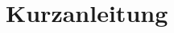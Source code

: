\documentclass[a4paper,11pt]{scrartcl}
\begin{document}
\section{Kurzanleitung}\label{Kurzanleitung}



\end{document}
